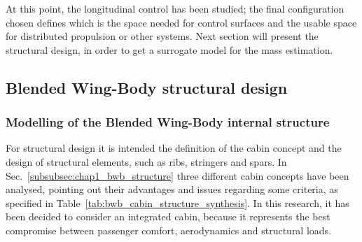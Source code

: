 At this point, the longitudinal control has been studied; the final configuration chosen defines which is the space needed for control surfaces and the usable space for distributed propulsion or other systems. 
Next section will present the structural design, in order to get a surrogate model for the mass estimation.

\subsection{Blended Wing-Body structural design}
\label{subsec:chap4_bwb_structural_design}

\subsubsection{Modelling of the Blended Wing-Body internal structure}
\label{subsubsec:chap4_bwb_internal_structure_model}

For structural design it is intended the definition of the cabin concept and the design of structural elements, such as ribs, stringers and spars.
In Sec.~\ref{subsubsec:chap1_bwb_structure} three different cabin concepts have been analysed, pointing out their advantages and issues regarding some criteria, as specified in Table~\ref{tab:bwb_cabin_structure_synthesis}. 
In this research, it has been decided to consider an integrated cabin, because it represents the best compromise between passenger comfort, aerodynamics and structural loads. 

